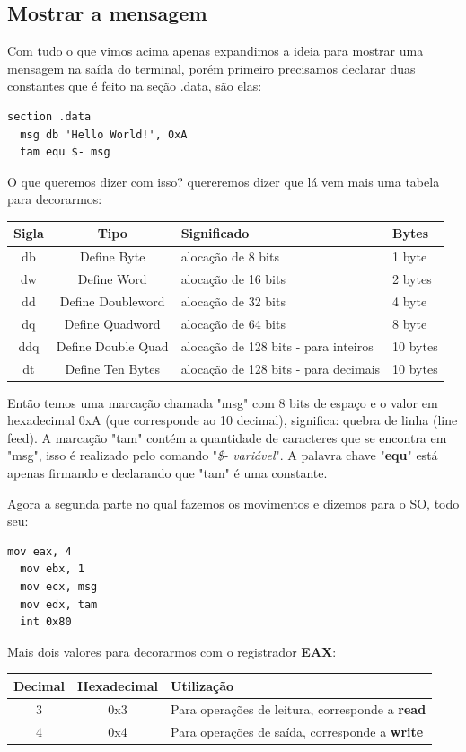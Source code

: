 \subsection{Mostrar a mensagem}
Com tudo o que vimos acima apenas expandimos a ideia para mostrar uma mensagem na saída do terminal, porém primeiro precisamos declarar duas constantes que é feito na seção .data, são elas: \\
\begin{lstlisting}[]
section .data
  msg db 'Hello World!', 0xA
  tam equ $- msg
\end{lstlisting}

O que queremos dizer com isso? quereremos dizer que lá vem mais uma tabela para decorarmos:
\begin{table}[H]
	\centering 
	\begin{tabular}{c | c | l | l }
		\textbf{Sigla} & \textbf{Tipo} & \textbf{Significado} & \textbf{Bytes} \\ \hline
		db & Define Byte & alocação de 8 bits & 1 byte\\
		dw & Define Word & alocação de 16 bits & 2 bytes \\
		dd & Define Doubleword & alocação de 32 bits & 4 byte\\
		dq & Define Quadword & alocação de 64 bits & 8 byte \\
		ddq & Define Double Quad & alocação de 128 bits - para inteiros & 10 bytes \\
		dt & Define Ten Bytes & alocação de 128 bits - para decimais & 10 bytes
	\end{tabular}
\end{table}

Então temos uma marcação chamada "msg" com 8 bits de espaço e o valor em hexadecimal 0xA (que corresponde ao 10 decimal), significa: quebra de linha (line feed). A marcação "tam" contém a quantidade de caracteres que se encontra em "msg", isso é realizado pelo comando "\textit{\$- variável}". A palavra chave "\textbf{equ}" está apenas firmando e declarando que "tam" é uma constante.

Agora a segunda parte no qual fazemos os movimentos e dizemos para o SO, todo seu:
\begin{lstlisting}[]
  mov eax, 4
  mov ebx, 1
  mov ecx, msg
  mov edx, tam
  int 0x80
\end{lstlisting}

Mais dois valores para decorarmos com o registrador \textbf{EAX}:
\begin{table}[H]
	\centering 
	\begin{tabular}{c | c | l }
		\textbf{Decimal} & \textbf{Hexadecimal} & \textbf{Utilização} \\ \hline
		3 & 0x3 & Para operações de leitura, corresponde a \textbf{read} \\
		4 & 0x4 & Para operações de saída, corresponde a \textbf{write}
	\end{tabular}
\end{table}

